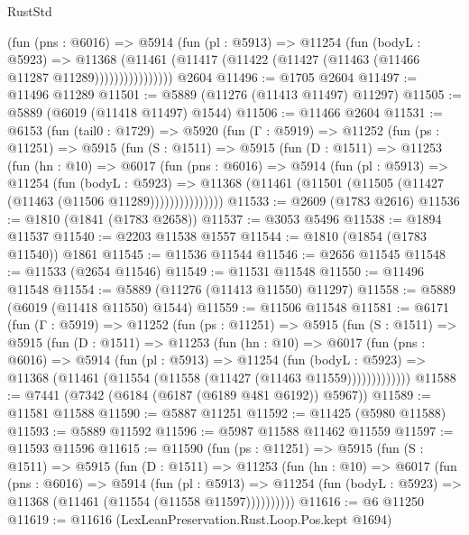 \begin{lexlean}{RustStd}
\begin{coremodule}
                  (fun (pns : @6016) =>
                  @5914
                    (fun (pl : @5913) =>
                    @11254
                      (fun (bodyL : @5923) =>
                      @11368
                        (@11461
                          (@11417 (@11422 (@11427 (@11463 (@11466 @11287 @11289))))))))))))))))
    @2604
@11496 := @1705 @2604
@11497 := @11496 @11289
@11501 := @5889 (@11276 (@11413 @11497) @11297)
@11505 := @5889 (@6019 (@11418 @11497) @1544)
@11506 := @11466 @2604
@11531 := @6153
    (fun (tail0 : @1729) =>
    @5920
      (fun (Γ : @5919) =>
      @11252
        (fun (ps : @11251) =>
        @5915
          (fun (S : @1511) =>
          @5915
            (fun (D : @1511) =>
            @11253
              (fun (hn : @10) =>
              @6017
                (fun (pns : @6016) =>
                @5914
                  (fun (pl : @5913) =>
                  @11254
                    (fun (bodyL : @5923) =>
                    @11368 (@11461 (@11501 (@11505 (@11427 (@11463 (@11506 @11289)))))))))))))))
@11533 := @2609 (@1783 @2616)
@11536 := @1810 (@1841 (@1783 @2658))
@11537 := @3053 @5496
@11538 := @1894 @11537
@11540 := @2203 @11538 @1557
@11544 := @1810 (@1854 (@1783 @11540)) @1861
@11545 := @11536 @11544
@11546 := @2656 @11545
@11548 := @11533 (@2654 @11546)
@11549 := @11531 @11548
@11550 := @11496 @11548
@11554 := @5889 (@11276 (@11413 @11550) @11297)
@11558 := @5889 (@6019 (@11418 @11550) @1544)
@11559 := @11506 @11548
@11581 := @6171
    (fun (Γ : @5919) =>
    @11252
      (fun (ps : @11251) =>
      @5915
        (fun (S : @1511) =>
        @5915
          (fun (D : @1511) =>
          @11253
            (fun (hn : @10) =>
            @6017
              (fun (pns : @6016) =>
              @5914
                (fun (pl : @5913) =>
                @11254
                  (fun (bodyL : @5923) =>
                  @11368 (@11461 (@11554 (@11558 (@11427 (@11463 @11559)))))))))))))
@11588 := @7441 (@7342 (@6184 (@6187 (@6189 @481 @6192)) @5967))
@11589 := @11581 @11588
@11590 := @5887 @11251
@11592 := @11425 (@5980 @11588)
@11593 := @5889 @11592
@11596 := @5987 @11588 @11462 @11559
@11597 := @11593 @11596
@11615 := @11590
    (fun (ps : @11251) =>
    @5915
      (fun (S : @1511) =>
      @5915
        (fun (D : @1511) =>
        @11253
          (fun (hn : @10) =>
          @6017
            (fun (pns : @6016) =>
            @5914
              (fun (pl : @5913) =>
              @11254 (fun (bodyL : @5923) => @11368 (@11461 (@11554 (@11558 @11597))))))))))
@11616 := @6 @11250
@11619 := @11616 (LexLeanPreservation.Rust.Loop.Pos.kept @1694)

\end{coremodule}
\end{lexlean}
